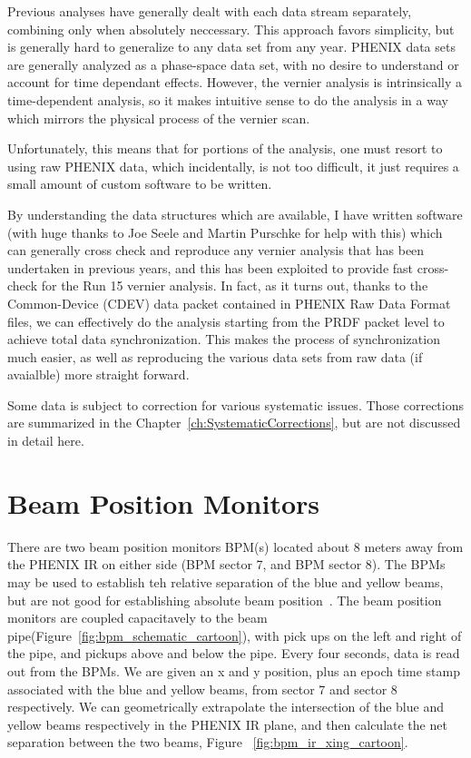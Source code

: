 Previous analyses have generally dealt with each data stream separately, combining only
when absolutely neccessary. This approach favors simplicity, but is generally hard to
generalize to any data set from any year. PHENIX data sets are generally analyzed as a
phase-space data set, with no desire to understand or account for time dependant effects.
However, the vernier analysis is intrinsically a time-dependent analysis, so it makes
intuitive sense to do the analysis in a way which mirrors the physical process of the
vernier scan.

Unfortunately, this means that for portions of the analysis, one must resort to using raw
PHENIX data, which incidentally, is not too difficult, it just requires a small amount of
custom software to be written.

By understanding the data structures which are available, I have written software (with
huge thanks to Joe Seele and Martin Purschke for help with this) which can generally cross
check and reproduce any vernier analysis that has been undertaken in previous years, and
this has been exploited to provide fast cross-check for the Run 15 vernier analysis. In
fact, as it turns out, thanks to the Common-Device (CDEV) data packet contained in PHENIX
Raw Data Format files, we can effectively do the analysis starting from the PRDF packet
level to achieve total data synchronization. This makes the process of synchronization
much easier, as well as reproducing the various data sets from raw data (if avaialble)
more straight forward. 

Some data is subject to correction for various systematic issues. Those corrections are
summarized in the Chapter~\ref{ch:SystematicCorrections}, but are not discussed in detail
here.

\section{Beam Position Monitors}
There are two beam position monitors BPM(s) located about 8 meters away from the PHENIX IR
on either side (BPM sector 7, and BPM sector 8). The BPMs may be used to establish teh
relative separation of the blue and yellow beams, but are not good for establishing
absolute beam position~\cite{drees2013}.  The beam position monitors are coupled
capacitavely to the beam pipe(Figure~\ref{fig:bpm_schematic_cartoon}), with pick ups on
the left and right of the pipe, and pickups above and below the pipe. Every four seconds,
data is read out from the BPMs. We are given an x and y position, plus an epoch time stamp
associated with the blue and yellow beams, from sector 7 and sector 8 respectively. We can
geometrically extrapolate the intersection of the blue and yellow beams respectively in
the PHENIX IR plane, and then calculate the net separation between the two beams, Figure
~\ref{fig:bpm_ir_xing_cartoon}.

